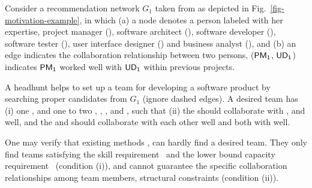 \begin{example}
\label{exm-motivation}
Consider a recommendation network $G_1$ taken from \cite{TerveenM05} as depicted in Fig.~\ref{fig-motivation-example},
in which (a) a node denotes a person labeled with her expertise, \eg project manager (), software architect (), software developer (), software tester (),
user interface designer () and business analyst (),
and (b) an edge indicates the collaboration relationship between two persons, \eg (${\mathsf{PM_{1}}}$, ${\mathsf{UD_{1}}}$) indicates ${\mathsf{PM_{1}}}$ worked well with ${\mathsf{UD_{1}}}$ within previous projects.

A headhunt helps to set up a team for developing a software product by searching proper candidates from $G_1$ (ignore dashed edges).
A desired team has
(i) one , and one to two , , ,  and , such that
(ii) the  should collaborate with ,  and  well, and the  and  should collaborate with each other well and both with  well.


One may verify that existing methods \cite{Lappas09,Kargar11,GajewarS12,realTeamForm13}, can hardly find a desired team.
They only find teams satisfying the skill requirement~\cite{Lappas09,Kargar11,GajewarS12} and the lower bound capacity requirement~\cite{GajewarS12,realTeamForm13}  (condition (i)), and cannot guarantee  the specific collaboration relationships among team members, \ie structural constraints (condition (ii)).
 \end{example}

